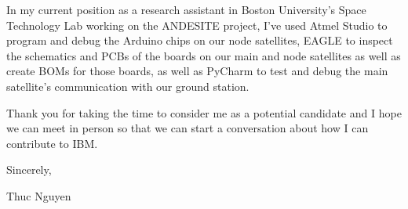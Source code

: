 \documentclass{article}
\begin{document}
\vspace{.6em}
In my current position as a research assistant in Boston University's Space Technology Lab working on the ANDESITE project, I've used Atmel Studio to program and debug the Arduino chips on our node satellites, EAGLE to inspect the schematics and PCBs of the boards on our main and node satellites as well as create BOMs for those boards, as well as PyCharm to test and debug the main satellite's communication with our ground station.

\vspace{.6em}
Thank you for taking the time to consider me as a potential candidate and I hope we can meet in person so that we can start a conversation about how I can contribute to IBM.

\begin{flushleft}
\vspace{1.6em}
Sincerely,

Thuc Nguyen
\end{flushleft}
\end{document}
